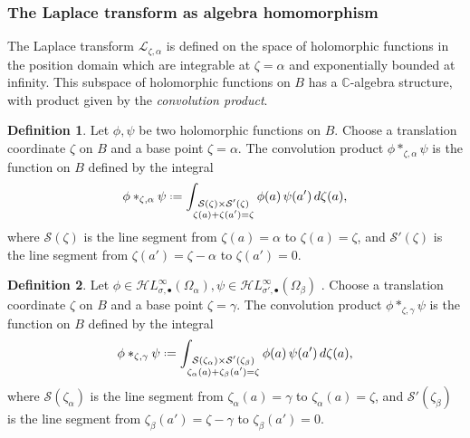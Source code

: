 \documentclass{article}
\newcommand{\singexp}[2]{\mathcal{H}L^\infty_{#1, #2}}
\newcommand{\singexpalg}[1]{\singexp{#1}{\bullet}}
\newcommand{\C}{\mathbb{C}}
\newcommand*{\defeq}{\mathrel{\vcenter{\baselineskip0.5ex \lineskiplimit0pt
                     \hbox{\scriptsize.}\hbox{\scriptsize.}}}%
                     =}
\newcommand{\laplace}{\mathcal{L}}
\theoremstyle{definition}
\newtheorem{definition}{Definition}[section]
\theoremstyle{plain}
\begin{document}
\subsubsection*{The Laplace transform as algebra homomorphism}
The Laplace transform $\laplace_{\zeta,\alpha}$ is defined on the space of holomorphic functions in the position domain which are integrable at $\zeta=\alpha$ and exponentially bounded at infinity. This subspace of holomorphic functions on $B$ has a $\C$-algebra structure, with product given by the \textit{convolution product}. 
\begin{definition}\label{def:convolution}
Let $\phi,\psi$ be two holomorphic functions on $B$. Choose a translation coordinate $\zeta$ on $B$ and a base point $\zeta = \alpha$. The convolution product $\phi\ast_{\zeta,\alpha}\psi$ is the function on $B$ defined by the integral
\begin{equation}%
\phi \ast_{\zeta, \alpha} \psi \defeq \int_{\substack{\mathcal{S}(\zeta)\times\mathcal{S}'(\zeta)\\ \zeta(a)+\zeta(a')=\zeta}} \phi(a)\,\psi(a')\,d\zeta(a),
\end{equation}
where $\mathcal{S}(\zeta)$ is the line segment from $\zeta(a)=\alpha$ to $\zeta(a)=\zeta$, and $\mathcal{S}'(\zeta)$ is the line segment from $\zeta(a')=\zeta-\alpha$ to $\zeta(a')=0$.
\end{definition}
\color{Turquoise}
\begin{definition}\label{def:convolution}
Let $\phi\in\singexpalg{\sigma}(\Omega_\alpha),\psi\in\singexpalg{\sigma'}(\Omega_\beta)$ . Choose a translation coordinate $\zeta$ on $B$ and a base point $\zeta = \gamma$. The convolution product $\phi\ast_{\zeta,\gamma}\psi$ is the function on $B$ defined by the integral
\begin{equation}%
\phi \ast_{\zeta, \gamma} \psi \defeq \int_{\substack{\mathcal{S}(\zeta_\alpha)\times\mathcal{S}'(\zeta_\beta)\\ \zeta_\alpha(a)+\zeta_\beta(a')=\zeta}} \phi(a)\,\psi(a')\,d\zeta(a),
\end{equation}
where $\mathcal{S}(\zeta_\alpha)$ is the line segment from $\zeta_\alpha(a)=\gamma$ to $\zeta_\alpha(a)=\zeta$, and $\mathcal{S}'(\zeta_\beta)$ is the line segment from $\zeta_\beta(a')=\zeta-\gamma$ to $\zeta_\beta(a')=0$.
\end{definition}
\color{black}
\end{document}
